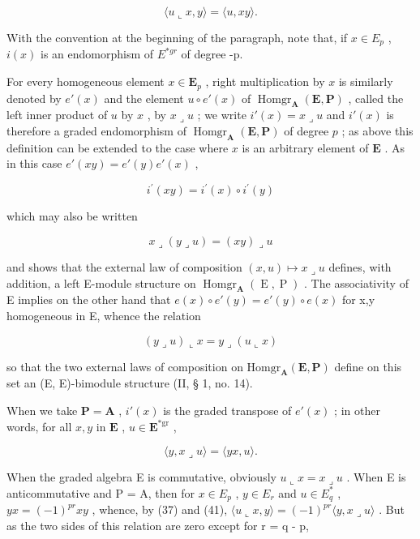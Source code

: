 \[
\langle u \llcorner x, y \rangle = \langle u, x y \rangle .\tag{37}
\]

With the convention at the beginning of the paragraph, note that, if \(x \in E_{p}\) , \(i(x)\) is an endomorphism of \(E^{*gr}\) of degree -p.

For every homogeneous element \(x \in \mathbf{E}_p\) , right multiplication by \(x\) is similarly denoted by \(e'(x)\) and the element \(u \circ e'(x)\) of \(\operatorname{Homgr}_{\mathbf{A}}(\mathbf{E}, \mathbf{P})\) , called the left inner product of \(u\) by \(x\) , by \(x \lrcorner u\) ; we write \(i'(x) = x \lrcorner u\) and \(i'(x)\) is therefore a graded endomorphism of \(\operatorname{Homgr}_{\mathbf{A}}(\mathbf{E}, \mathbf{P})\) of degree \(p\) ; as above this definition can be extended to the case where \(x\) is an arbitrary element of \(\mathbf{E}\) . As in this case \(e'(xy) = e'(y)e'(x)\) ,

\[
i ^ {\prime} (x y) = i ^ {\prime} (x) \circ i ^ {\prime} (y)\tag{38}
\]

which may also be written

\[
x \lrcorner (y \lrcorner u) = (x y) \lrcorner u\tag{39}
\]

and shows that the external law of composition \((x,u)\mapsto x\lrcorner u\) defines, with addition, a left E-module structure on \(\operatorname{Homgr}_{\mathbf{A}}(\operatorname{E},\operatorname{P})\) . The associativity of E implies on the other hand that \(e(x)\circ e'(y)=e'(y)\circ e(x)\) for x,y homogeneous in E, whence the relation

\[
(y \lrcorner u) \llcorner x = y \lrcorner (u \llcorner x)\tag{40}
\]

so that the two external laws of composition on \(\mathrm{Homgr}_{\mathbf{A}}(\mathbf{E},\mathbf{P})\) define on this set an (E, E)-bimodule structure (II, § 1, no. 14).

When we take \(\mathbf{P} = \mathbf{A}\) , \(i'(x)\) is the graded transpose of \(e'(x)\) ; in other words, for all \(x, y\) in \(\mathbf{E}\) , \(u \in \mathbf{E}^{*\mathrm{gr}}\) ,

\[
\langle y, x \lrcorner u \rangle = \langle y x, u \rangle .\tag{41}
\]

When the graded algebra E is commutative, obviously \(u \llcorner x = x \lrcorner u\) . When E is anticommutative and P = A, then for \(x \in E_{p}\) , \(y \in E_{r}\) and \(u \in E_{q}^{*}\) , \(yx = (-1)^{pr}xy\) , whence, by (37) and (41), \(\langle u \llcorner x, y \rangle = (-1)^{pr}\langle y, x \lrcorner u \rangle\) . But as the two sides of this relation are zero except for r = q - p,

